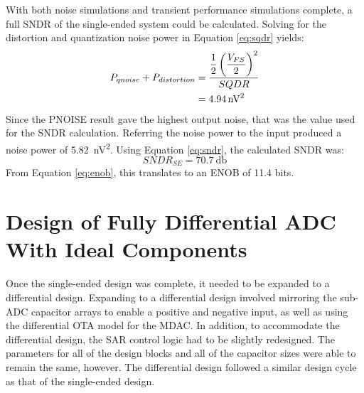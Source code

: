 With both noise simulations and transient performance simulations complete, a full SNDR of the single-ended system could be calculated. Solving for the distortion and quantization noise power in Equation \ref{eq:sqdr} yields: 
\begin{align}
\label{eq:pqplusdissingle}
P_{qnoise}+P_{distortion} &= \dfrac{\dfrac{1}{2}\left(\dfrac{V_{FS}}{2}\right)^{2}}{SQDR} \\
\nonu &= \SI{4.94}{\square\nano\volt}
\end{align}
Since the PNOISE result gave the highest output noise, that was the value used for the SNDR calculation. Referring the noise power to the input produced a noise power of \SI{5.82}{\square\nano\volt}. Using Equation \ref{eq:sndr}, the calculated SNDR was:
\begin{equation}
\label{eq:sndrsingle}
SNDR_{SE} = \SI{70.7}{\decibel}
\end{equation}
From Equation \ref{eq:enob}, this translates to an ENOB of 11.4 bits. 
\section{Design of Fully Differential ADC With Ideal Components}
Once the single-ended design was complete, it needed to be expanded to a differential design. Expanding to a differential design involved mirroring the sub-ADC capacitor arrays to enable a positive and negative input, as well as using the differential OTA model for the MDAC. In addition, to accommodate the differential design, the SAR control logic had to be slightly redesigned. The parameters for all of the design blocks and all of the capacitor sizes were able to remain the same, however. The differential design followed a similar design cycle as that of the single-ended design. 
